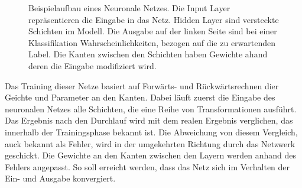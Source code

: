 \def\layersep{2.5cm}
\begin{figure}[!tb]
\begin{center}
\caption[Beispielaufbau eines Neuronale Netzes]{Beispielaufbau eines Neuronale Netzes. Die Input Layer repräsentieren die Eingabe in das Netz. Hidden Layer sind versteckte Schichten im Modell. Die Ausgabe auf der linken Seite sind bei einer Klassifikation Wahrscheinlichkeiten, bezogen auf die  zu erwartenden Label. Die Kanten zwischen den Schichten haben Gewichte ahand deren die Eingabe modifiziert wird.}\label{cap:neuralnet}
\end{center}
\end{figure}\label{fig:neuralnet}

Das Training dieser Netze basiert auf Forwärts- und Rückwärtsrechnen dier Geichte und Parameter an den Kanten. Dabei läuft zuerst die Eingabe des neuronalen Netzes alle Schichten, die eine Reihe von Transformationen ausführt. Das Ergebnis nach den Durchlauf wird mit dem realen Ergebnis verglichen, das innerhalb der Trainingsphase bekannt ist. Die Abweichung von diesem Vergleich, auck bekannt als Fehler, wird in der umgekehrten Richtung durch das Netzwerk geschickt. Die Gewichte an den Kanten zwischen den Layern werden anhand des Fehlers angepasst. So soll erreicht werden, dass das Netz sich im Verhalten der Ein- und Ausgabe konvergiert.


